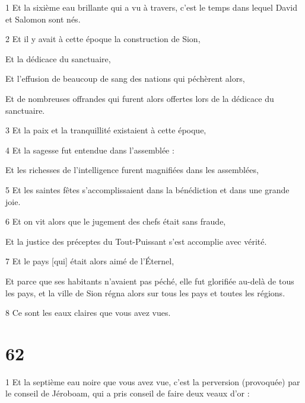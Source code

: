 \par 1 Et la sixième eau brillante qui a vu à travers, c'est le temps dans lequel David et Salomon sont nés.

\par 2 Et il y avait à cette époque la construction de Sion,

\par Et la dédicace du sanctuaire,

\par Et l'effusion de beaucoup de sang des nations qui péchèrent alors,

\par Et de nombreuses offrandes qui furent alors offertes lors de la dédicace du sanctuaire.

\par 3 Et la paix et la tranquillité existaient à cette époque,

\par 4 Et la sagesse fut entendue dans l'assemblée :

\par Et les richesses de l'intelligence furent magnifiées dans les assemblées,

\par 5 Et les saintes fêtes s'accomplissaient dans la bénédiction et dans une grande joie.

\par 6 Et on vit alors que le jugement des chefs était sans fraude,

\par Et la justice des préceptes du Tout-Puissant s'est accomplie avec vérité.

\par 7 Et le pays [qui] était alors aimé de l'Éternel,

\par Et parce que ses habitants n'avaient pas péché, elle fut glorifiée au-delà de tous les pays, et la ville de Sion régna alors sur tous les pays et toutes les régions.

\par 8 Ce sont les eaux claires que vous avez vues.

\chapter{62}

\par 1 Et la septième eau noire que vous avez vue, c'est la perversion (provoquée) par le conseil de Jéroboam, qui a pris conseil de faire deux veaux d'or :

